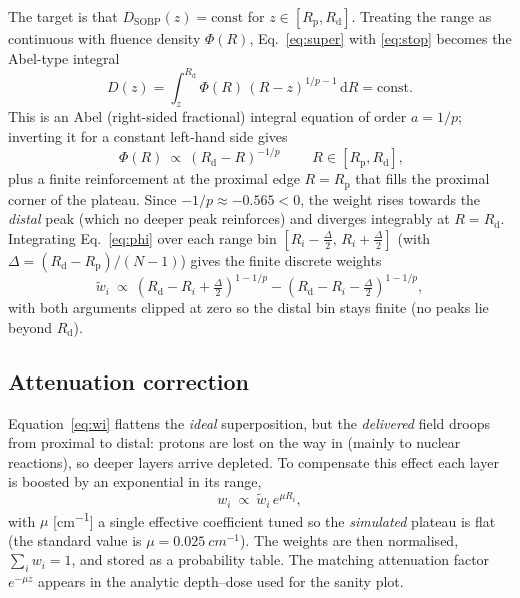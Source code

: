 \documentclass[11pt]{article}
\newcommand{\Rd}{R_{\mathrm d}}
\newcommand{\Rp}{R_{\mathrm p}}
\begin{document}
The target is that  $D_{\mathrm{SOBP}}(z)=\text{const}$ for $z\in[\Rp,\Rd]$. Treating the
range as continuous with fluence density $\Phi(R)$, Eq.~\eqref{eq:super} with
\eqref{eq:stop} becomes the Abel-type integral
\begin{equation}
D(z)=\int_z^{\Rd}\Phi(R)\,(R-z)^{1/p-1}\,\mathrm dR =\text{const}.
\end{equation}
This is an Abel (right-sided fractional) integral equation of order $a=1/p$;
inverting it for a constant left-hand side gives
\begin{equation}
\boxed{\;\Phi(R)\ \propto\ (\Rd-R)^{-1/p}\;}\qquad R\in[\Rp,\Rd],
\label{eq:phi}
\end{equation}
plus a finite reinforcement at the proximal edge $R=\Rp$ that fills the proximal
corner of the plateau. Since $-1/p\approx-0.565<0$, the weight rises towards the
\emph{distal} peak (which no deeper peak reinforces) and diverges integrably at
$R=\Rd$. Integrating Eq.~\eqref{eq:phi} over each range bin
$[R_i-\tfrac{\Delta}{2},\,R_i+\tfrac{\Delta}{2}]$ (with $\Delta=(\Rd-\Rp)/(N-1)$)
gives the finite discrete weights
\begin{equation}
\tilde w_i\ \propto\ (\Rd-R_i+\tfrac{\Delta}{2})^{1-1/p}-(\Rd-R_i-\tfrac{\Delta}{2})^{1-1/p},
\label{eq:wi}
\end{equation}
with both arguments clipped at zero so the distal bin stays finite (no peaks lie
beyond $\Rd$).

\subsection{Attenuation correction}
\label{sec:atten}

Equation~\eqref{eq:wi} flattens the \emph{ideal} superposition, but the
\emph{delivered} field droops from proximal to distal: protons are lost on the
way in (mainly to nuclear reactions), so deeper layers arrive depleted. To compensate this effect each layer is boosted by an exponential in its range,
\begin{equation}
w_i\ \propto\ \tilde w_i\,e^{\mu R_i},
\label{eq:atten}
\end{equation}
with $\mu$ [\si{cm^{-1}}] a single effective coefficient tuned so the
\emph{simulated} plateau is flat (the standard value is
$\mu=\SI{0.025}{cm^{-1}}$). The weights are then normalised, $\sum_i w_i=1$, and
stored as a probability table. The matching attenuation factor $e^{-\mu z}$
appears in the analytic depth--dose used for the sanity plot.
\end{document}

